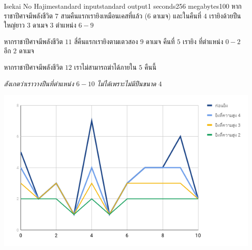 \documentclass[11pt,a4paper]{article}
\begin{document}
\begin{problem}{Isekai No Hajime}{standard input}{standard output}{1 seconds}{256 megabytes}{100}
หากราชาปีศาจมีพลังชีวิต $7$ สามคืนแรกเรายิงเหมือนเคสที่แล้ว ($6$ ดาเมจ) และในคืนที่ $4$ เรายิงด้วยปืนใหญ่ยาว $3$ ดาเมจ $3$ ตำแหน่ง $6 - 9$

หากราชาปีศาจมีพลังชีวิต $11$ สี่คืนแรกเรายิงตามเตวสอง $9$ ดาเมจ คืนที่ $5$ เรายิง ที่ตำแหน่ง $0 - 2$ อีก $2$ ดาเมจ

หากราชาปีศาจมีพลังชีวิต $12$ เราไม่สามารถฆ่าได้ภายใน $5$ คืนนี้

\textit{สังเกตว่าเราวางปืนที่ตำแหน่ง $6 - 10$ ไม่ได้เพราะไม่มีปืนขนาด $4$}

\includegraphics[width=\textwidth]{chart.png}

\end{problem}
\end{document}
